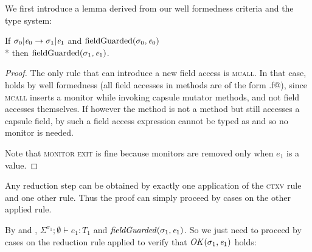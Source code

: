 We first introduce a lemma derived from our well formedness criteria and the type system:
\begin{Lemma}\rm
If $\sigma_0 | {\mathit{e}}_0\rightarrow \sigma_1 |{\mathit{e}}_1$ and
$\text{fieldGuarded}(\sigma_0,{\mathit{e}}_0)$
\\*
then $\text{fieldGuarded}(\sigma_1,{\mathit{e}}_1)$.
\end{Lemma}
\begin{proof}
The only rule that can
introduce a new field access is \textsc{mcall}.
In that case,  holds
by well formedness (all field accesses in methods are of the form \Q@this.f@),
since \textsc{mcall} inserts a monitor while invoking capsule mutator methods, and not field accesses themselves. If however the method is not a \Q@mut@ method but still accesses a capsule field, by  such a field access expression cannot be typed as \Q@mut@ and so no monitor is needed.

Note that \textsc{monitor exit} is fine because monitors are removed only when
 $e_1$ is a value.
\end{proof}

\saveSpace
Any reduction step can be obtained
by exactly one application of the \textsc{ctxv} rule and one other rule. Thus the proof can simply proceed by cases on the other applied rule.

By  and ,
$\Sigma^{\sigma_1};\emptyset\vdash e_1: T_1$ and  $\mathit{fieldGuarded}(\sigma_1,{\mathit{e}}_1)$. So we just need to proceed by cases on the reduction rule applied to verify that $\mathit{OK}(\sigma_1,{\mathit{e}}_1)$ holds:


